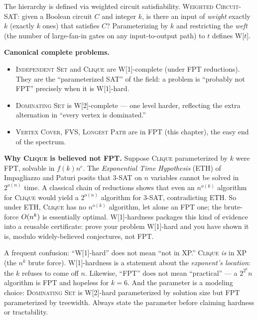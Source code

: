 The hierarchy is defined via weighted circuit satisfiability. \textsc{Weighted Circuit-SAT}: given a Boolean circuit $C$ and integer $k$, is there an input of \emph{weight} exactly $k$ (exactly $k$ ones) that satisfies $C$? Parameterizing by $k$ and restricting the \emph{weft} (the number of large-fan-in gates on any input-to-output path) to $t$ defines W[$t$].

\begin{focusbox}
\textbf{Canonical complete problems.}
\begin{itemize}
  \item \textsc{Independent Set} and \textsc{Clique} are W[1]-complete (under FPT reductions). They are the ``parameterized SAT'' of the field: a problem is ``probably not FPT'' precisely when it is W[1]-hard.
  \item \textsc{Dominating Set} is W[2]-complete --- one level harder, reflecting the extra alternation in ``every vertex is dominated.''
  \item \textsc{Vertex Cover}, \textsc{FVS}, \textsc{Longest Path} are in FPT (this chapter), the easy end of the spectrum.
\end{itemize}
\end{focusbox}

\begin{whybox}
\textbf{Why \textsc{Clique} is believed not FPT.} Suppose \textsc{Clique} parameterized by $k$ were FPT, solvable in $f(k)n^c$. The \emph{Exponential Time Hypothesis} (ETH) of Impagliazzo and Paturi posits that $3$-SAT on $n$ variables cannot be solved in $2^{o(n)}$ time. A classical chain of reductions shows that even an $n^{o(k)}$ algorithm for \textsc{Clique} would yield a $2^{o(n)}$ algorithm for $3$-SAT, contradicting ETH. So under ETH, \textsc{Clique} has no $n^{o(k)}$ algorithm, let alone an FPT one; the brute-force $O(n^k)$ is essentially optimal. W[1]-hardness packages this kind of evidence into a reusable certificate: prove your problem W[1]-hard and you have shown it is, modulo widely-believed conjectures, not FPT.
\end{whybox}

\begin{trapbox}
A frequent confusion: ``W[1]-hard'' does not mean ``not in XP.'' \textsc{Clique} \emph{is} in XP (the $n^k$ brute force). W[1]-hardness is a statement about the \emph{exponent's location}: the $k$ refuses to come off $n$. Likewise, ``FPT'' does not mean ``practical'' --- a $2^{2^k}n$ algorithm is FPT and hopeless for $k=6$. And the parameter is a modeling choice: \textsc{Dominating Set} is W[2]-hard parameterized by solution size but FPT parameterized by treewidth. Always state the parameter before claiming hardness or tractability.
\end{trapbox}

